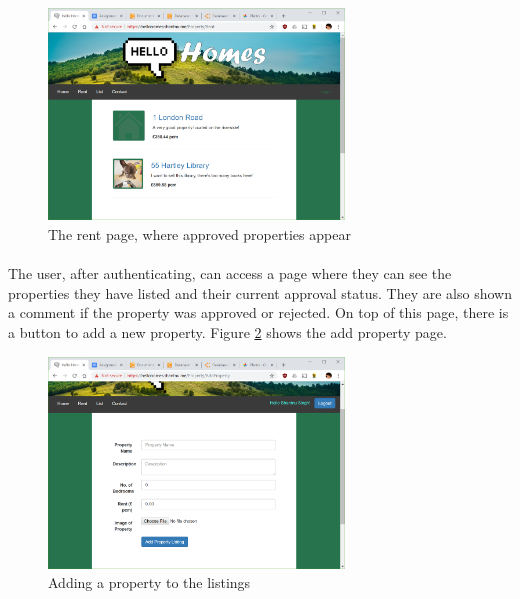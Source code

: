 \documentclass{article}
\begin{document}
            \begin{figure}[!htb]
                \centering
                \includegraphics[width=0.7\textwidth]{figures/rent.png}
                \caption[Rent Page]{The rent page, where approved properties appear}
                \label{fig:rent_page}
            \end{figure}

        \paragraph{}
            The user, after authenticating, can access a page where they can see the properties they have listed and their current approval status.
            They are also shown a comment if the property was approved or rejected.
            On top of this page, there is a button to add a new property.
            Figure \ref{fig:add_property} shows the add property page.

            \begin{figure}[!htb]
                \centering
                \includegraphics[width=0.7\textwidth]{figures/add_property.png}
                \caption[Add Property]{Adding a property to the listings}
                \label{fig:add_property}
            \end{figure}
\end{document}

